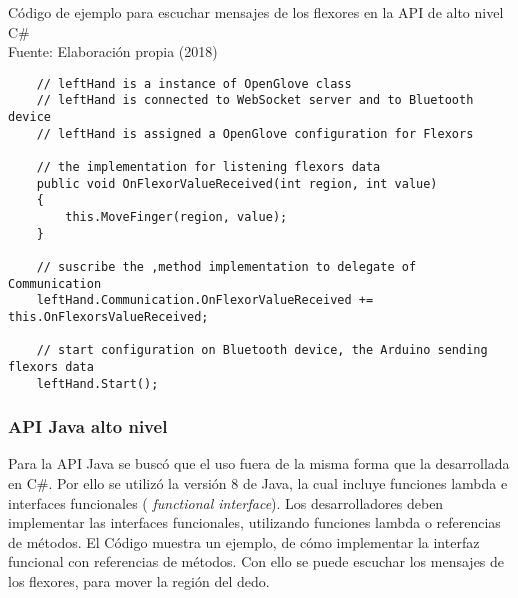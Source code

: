\begin{algorithm}[!ht]
  \begin{center} 
   	\captionsetup{justification=centering}
    \caption[Código de ejemplo para escuchar mensajes de los flexores en la API de alto nivel C\#]{Código de ejemplo para escuchar mensajes de los flexores en la API de alto nivel C\#\\ \tab[4cm] Fuente: Elaboración propia (2018)}
    \label{code:api-chsharp}
  \end{center}
  \begin{lstlisting}
	// leftHand is a instance of OpenGlove class
	// leftHand is connected to WebSocket server and to Bluetooth device
	// leftHand is assigned a OpenGlove configuration for Flexors
	
	// the implementation for listening flexors data
	public void OnFlexorValueReceived(int region, int value)
	{
		this.MoveFinger(region, value);
	}
		
	// suscribe the ,method implementation to delegate of Communication
	leftHand.Communication.OnFlexorValueReceived += this.OnFlexorsValueReceived;
	
	// start configuration on Bluetooth device, the Arduino sending flexors data
	leftHand.Start();
  \end{lstlisting}
\end{algorithm}
	
	\subsubsection{API Java alto nivel}
	Para la API Java se buscó que el uso fuera de la misma forma que la desarrollada en C\#. Por ello se utilizó la versión 8 de Java, la cual incluye funciones lambda e  interfaces funcionales (\textit{ functional interface}). Los desarrolladores deben implementar las interfaces funcionales, utilizando funciones lambda o referencias de métodos. El Código muestra un ejemplo, de cómo implementar la interfaz funcional con referencias de métodos. Con ello se puede escuchar los mensajes de los flexores, para mover la región del dedo.
	
